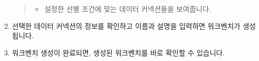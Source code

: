 \documentclass[letterpaper,10pt,english]{sphinxmanual}
\begin{document}
\begin{enumerate}
\begin{quote}
\begin{itemize}
\item {} 
 설정한 선별 조건에 맞는 데이터 커넥션들을 보여줍니다.

\end{itemize}
\end{quote}

\item {} 
선택한 데이터 커넥션의 정보를 확인하고 이름과 설명을 입력하면 워크벤치가 생성됩니다.
\begin{quote}

\begin{figure}[H]
\centering

\noindent{}
\end{figure}
\end{quote}

\item {} 
워크벤치 생성이 완료되면, 생성된 워크벤치를 바로 확인할 수 있습니다.

\end{enumerate}
\end{document}
